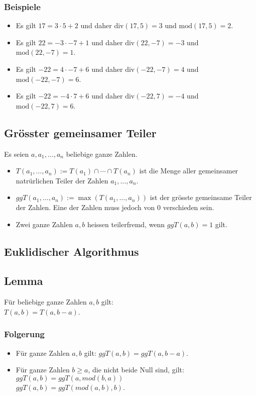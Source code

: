 \subsubsection{Beispiele}
\begin{itemize}
	\item Es gilt $17 = 3 \cdot 5 + 2$ und daher $\text{div}(17, 5) = 3$ und
	      $\text{mod}(17, 5) = 2$.
	\item Es gilt $22 = -3 \cdot -7 + 1$ und daher $\text{div}(22, -7) = -3$ und
	      $\text{mod}(22, -7) = 1$.
	\item Es gilt $-22 = 4 \cdot -7 + 6$ und daher $\text{div}(-22, -7) = 4$ und
	      $\text{mod}(-22, -7) = 6$.
	\item Es gilt $-22 = -4 \cdot 7 + 6$ und daher $\text{div}(-22, 7) = -4$ und
	      $\text{mod}(-22, 7) = 6$.
\end{itemize}
\subsection{Grösster gemeinsamer Teiler}
Es seien $a,a_1, \dots,a_n$ beliebige ganze Zahlen.
\begin{itemize}
	\item $T(a_1, \dots,a_n) := T(a_1) \cap \cdots \cap T(a_n)$ ist die Menge aller gemeinsamer natrürlichen
	      Teiler der Zahlen $a_1, \dots,a_n$.
	\item $ggT(a_1, \dots,a_n) := \max(T(a_1, \dots,a_n))$ ist der grösste gemeinsame Teiler der Zahlen.
	      Eine der Zahlen muss jedoch von $0$ verschieden sein.
	\item Zwei ganze Zahlen $a,b$ heissen teilerfremd, wenn $ggT(a,b) = 1$ gilt.
\end{itemize}
\subsection{Euklidischer Algorithmus}
\subsection{Lemma}
Für beliebige ganze Zahlen $a,b$ gilt: \\$T(a,b) = T(a,b-a)$.
\subsubsection{Folgerung}
\begin{itemize}
	\item Für ganze Zahlen $a,b$ gilt: $ggT(a,b) = ggT(a,b-a)$.\\
	\item Für ganze Zahlen $b \geq a$, die nicht beide Null sind, gilt: \\$ggT(a,b) = ggT(a, mod(b,a))$
	      \\$ggT(a,b) = ggT(mod(a,b),b)$.
\end{itemize}
